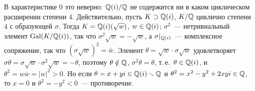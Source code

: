 \begin{remark}[5.32v]
В характеристике $0$ это неверно: $\mathbb Q(i)/\mathbb Q$ не содержится ни в каком циклическом расширении степени $4$. Действительно,
пусть $K\supset\mathbb Q(i)$, $K/\mathbb Q$ циклично степени $4$ с образующей $\sigma$. Тогда $K=\mathbb Q(i)(\sqrt w)$, $w\in\mathbb Q(i)$;
$\sigma^2$~--- нетривиальный элемент $\operatorname{Gal}(K/\mathbb Q(i))$, так что $\sigma^2\sqrt w=-\sqrt w$, а $\sigma|_{\mathbb Q(i)}$~--- комплексное
сопряжение, так что $(\sigma\sqrt w)^2=\bar w$. Элемент $\theta=\sqrt w\cdot\sigma\sqrt w$ удовлетворяет
$\sigma\theta=\sigma\sqrt w\cdot\sigma^2\sqrt w=-\theta$, поэтому $\theta\notin\mathbb Q$, $\sigma^2\theta=\theta$, т.\,е.\ $\theta\in\mathbb Q(i)$, и
$\theta^2=w\bar w=|w|^2>0$. Но если $\theta=x+yi\in\mathbb Q(i)\smallsetminus\mathbb Q$ и $\theta^2=x^2-y^2+2xyi\in\mathbb Q$, то $x=0$ и
$\theta^2=-y^2<0$~--- противоречие.
\end{remark}

